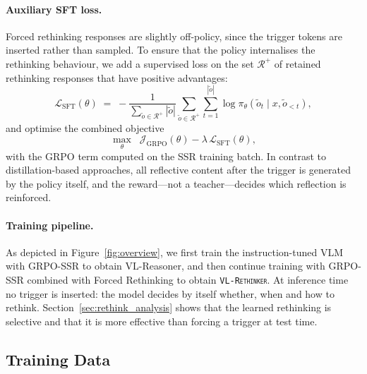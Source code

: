 \documentclass{article}
\newcommand{\model}{\texttt{\textsc{VL-Rethinker}}\xspace}
\begin{document}
\paragraph{Auxiliary SFT loss.} Forced rethinking responses are slightly off-policy, since the trigger tokens are inserted rather than sampled. To ensure that the policy internalises the rethinking behaviour, we add a supervised loss on the set $\mathcal{R}^{+}$ of retained rethinking responses that have positive advantages:
\begin{equation}
\mathcal{L}_{\mathrm{SFT}}(\theta) \;=\; -\frac{1}{\sum_{\tilde{o}\in\mathcal{R}^{+}}|\tilde{o}|}\sum_{\tilde{o}\in\mathcal{R}^{+}}\sum_{t=1}^{|\tilde{o}|}\log\pi_\theta(\tilde{o}_t\mid x,\tilde{o}_{<t}),
\end{equation}
and optimise the combined objective
\begin{equation}
\max_\theta\;\; \mathcal{J}_{\mathrm{GRPO}}(\theta) - \lambda\,\mathcal{L}_{\mathrm{SFT}}(\theta),
\label{eq:total}
\end{equation}
with the GRPO term computed on the SSR training batch. In contrast to distillation-based approaches, all reflective content after the trigger is generated by the policy itself, and the reward---not a teacher---decides which reflection is reinforced.

\paragraph{Training pipeline.} As depicted in Figure~\ref{fig:overview}, we first train the instruction-tuned VLM with GRPO-SSR to obtain VL-Reasoner, and then continue training with GRPO-SSR combined with Forced Rethinking to obtain \model. At inference time no trigger is inserted: the model decides by itself whether, when and how to rethink. Section~\ref{sec:rethink_analysis} shows that the learned rethinking is selective and that it is more effective than forcing a trigger at test time.

\subsection{Training Data}
\label{sec:data}
\end{document}
